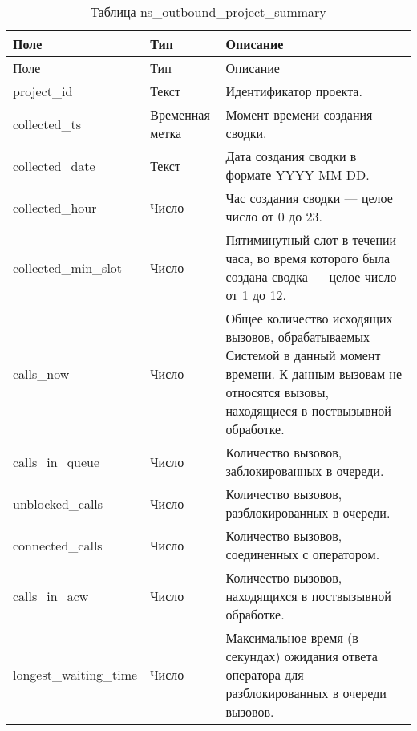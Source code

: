 \begin{small}
    \begin{longtable}{|p{}|p{}|p{}|}
        \caption{Таблица ns\_outbound\_project\_summary}
        \label{tab:db:ns-outbound-project-summary}
        \\ \hline
        Поле & Тип & Описание \\
        \hline \endfirsthead
        \hline
        Поле & Тип & Описание \\
        \hline
        \endhead
        \hline \endlastfoot
        project\_id &
        Текст &
                Идентификатор проекта.\\
\hline
        collected\_ts &
        Временная метка &
                Момент времени создания сводки.\\
\hline
        collected\_date &
        Текст &
                Дата создания сводки в формате YYYY-MM-DD.\\
\hline
        collected\_hour &
        Число &
                Час создания сводки — целое число от 0 до 23.\\
\hline
        collected\_min\_slot &
        Число &
                Пятиминутный слот в течении часа, во время которого была создана сводка — целое число от 1 до 12.\\
\hline
        calls\_now &
        Число &
                Общее количество исходящих вызовов, обрабатываемых Системой в данный момент времени.
        К данным вызовам не относятся вызовы, находящиеся в поствызывной обработке.\\
\hline
        calls\_in\_queue &
        Число &
                Количество вызовов, заблокированных в очереди.\\
\hline
        unblocked\_calls &
        Число &
                Количество вызовов, разблокированных в очереди.\\
\hline
        connected\_calls &
        Число &
                Количество вызовов, соединенных с оператором.\\
\hline
        calls\_in\_acw &
        Число &
                Количество вызовов, находящихся в поствызывной обработке.\\
\hline
        longest\_waiting\_time &
        Число &
                Максимальное время (в секундах) ожидания ответа оператора для разблокированных в очереди вызовов.\\
    \end{longtable}
\end{small}

